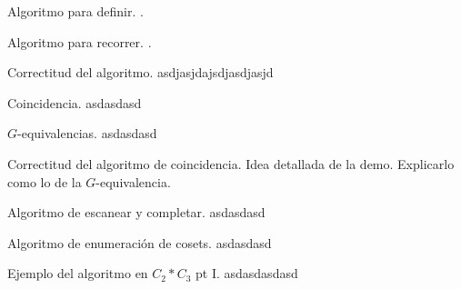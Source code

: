 \documentclass[aspectratio=169, 9pt]{beamer}
\begin{document}
\begin{frame}[fragile]{Algoritmo para definir.}
	.
\end{frame}

\begin{frame}[fragile]{Algoritmo para recorrer.}
.	
\end{frame}

\begin{frame}[fragile]{Correctitud del algoritmo.}
asdjasjdajsdjasdjasjd
\end{frame}

\begin{frame}[fragile]{Coincidencia.}
	asdasdasd
\end{frame}

\begin{frame}[fragile]{$G$-equivalencias.}
 asdasdasd
\end{frame}

\begin{frame}[fragile]{Correctitud del algoritmo de coincidencia.}
	Idea detallada de la demo. Explicarlo como lo de la $G$-equivalencia.
\end{frame}

\begin{frame}[fragile]{Algoritmo de escanear y completar.}
	asdasdasd
\end{frame}

\begin{frame}[fragile]{Algoritmo de enumeración de cosets.}
asdasdasd
\end{frame}

\begin{frame}[fragile]{Ejemplo del algoritmo en $C_2 \ast C_3$ pt I.}
asdasdasdasd
\end{frame}
\end{document}
